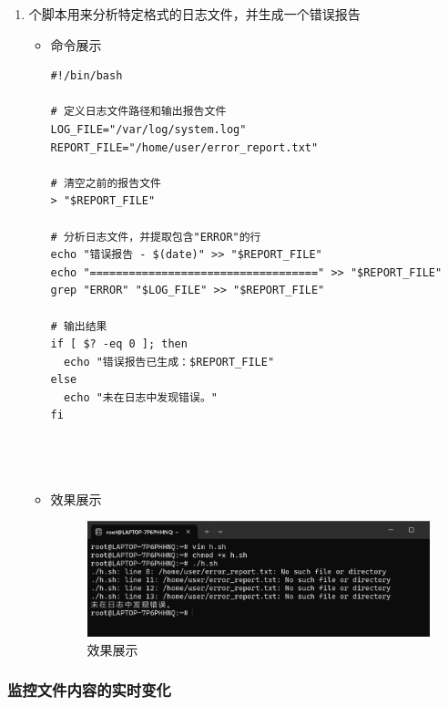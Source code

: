 \documentclass[UTF8]{ctexart}
\begin{document}
\begin{enumerate}
  \item 个脚本用来分析特定格式的日志文件，并生成一个错误报告
  \begin{itemize}
  \item 命令展示
  \begin{verbatim}
#!/bin/bash

# 定义日志文件路径和输出报告文件
LOG_FILE="/var/log/system.log"
REPORT_FILE="/home/user/error_report.txt"

# 清空之前的报告文件
> "$REPORT_FILE"

# 分析日志文件，并提取包含"ERROR"的行
echo "错误报告 - $(date)" >> "$REPORT_FILE"
echo "===================================" >> "$REPORT_FILE"
grep "ERROR" "$LOG_FILE" >> "$REPORT_FILE"

# 输出结果
if [ $? -eq 0 ]; then
  echo "错误报告已生成：$REPORT_FILE"
else
  echo "未在日志中发现错误。"
fi


    
  \end{verbatim}

  \item 效果展示
  \begin{figure}[H]
    \centering
    \includegraphics[width=\textwidth]{13} %
    \caption{效果展示}
  
  \end{figure}
\end{itemize}
\end{enumerate}
\subsubsection{监控文件内容的实时变化}
\end{document}
